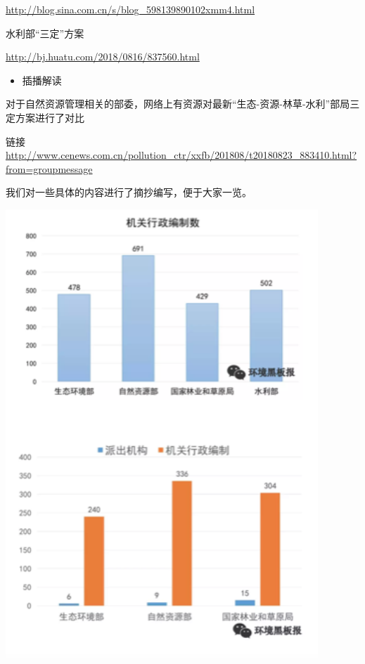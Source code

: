 \documentclass[
]{book}
\providecommand{\tightlist}{%
  \setlength{\itemsep}{0pt}\setlength{\parskip}{0pt}}
\begin{document}
\url{http://blog.sina.com.cn/s/blog_598139890102xmm4.html}

水利部``三定''方案

\url{http://bj.huatu.com/2018/0816/837560.html}

\begin{itemize}
\tightlist
\item
  插播解读
\end{itemize}

对于自然资源管理相关的部委，网络上有资源对最新``生态-资源-林草-水利''部局三定方案进行了对比

链接 \url{http://www.cenews.com.cn/pollution_ctr/xxfb/201808/t20180823_883410.html?from=groupmessage}

我们对一些具体的内容进行了摘抄编写，便于大家一览。

\includegraphics[width=4.62in]{images/zc1}
\end{document}
